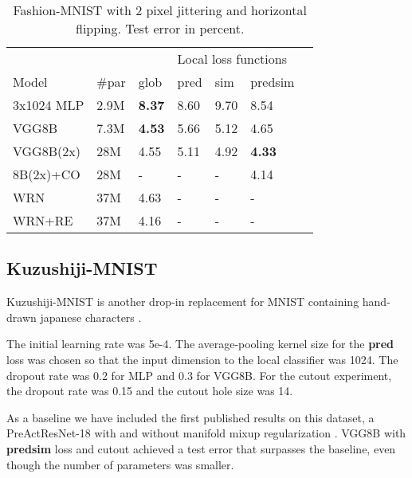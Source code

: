 \documentclass{article}
\begin{document}
\begin{table}[h]
  \caption{Fashion-MNIST with 2 pixel jittering and horizontal flipping. Test error in percent.}
  \label{table:fmnist}
  \centering
  \begin{tabular}{lllllll}
    \toprule
    &&& \multicolumn{3}{|l}{Local loss functions} \\
    Model   & \#par & glob & \multicolumn{1}{|l}{pred} & sim & \multicolumn{1}{l}{predsim}  \\
    \midrule
    3x1024 MLP & 2.9M &  \textbf{8.37} & \multicolumn{1}{|l}{8.60} & 9.70  & 8.54 \\
    VGG8B & 7.3M &  \textbf{4.53} & \multicolumn{1}{|l}{5.66} & 5.12  & 4.65 \\
    VGG8B(2x) & 28M & 4.55 & \multicolumn{1}{|l}{5.11} & 4.92 &  \textbf{4.33} \\
    8B(2x)+CO & 28M & - & \multicolumn{1}{|l}{-} & - &  4.14 \\
    \midrule
    WRN & 37M & 4.63  & \multicolumn{1}{|l}{-} & - & - \\
    WRN+RE& 37M & 4.16  & \multicolumn{1}{|l}{-} & - & - \\
    \bottomrule
  \end{tabular}
\end{table}

\subsection{Kuzushiji-MNIST}

Kuzushiji-MNIST is another drop-in replacement for MNIST containing hand-drawn japanese characters \cite{Kuzushiji18}. 

The initial learning rate was 5e-4. The average-pooling kernel size for the \textbf{pred} loss was chosen so that the input dimension to the local classifier was 1024. The dropout rate was 0.2 for MLP and 0.3 for VGG8B. For the cutout experiment, the dropout rate was 0.15 and the cutout hole size was 14.

As a baseline we have included the first published results on this dataset, a PreActResNet-18 \cite{HeZRS16} with and without manifold mixup regularization \cite{Kuzushiji18}. VGG8B with \textbf{predsim} loss and cutout achieved a test error that surpasses the baseline, even though the number of parameters was smaller.
\end{document}
